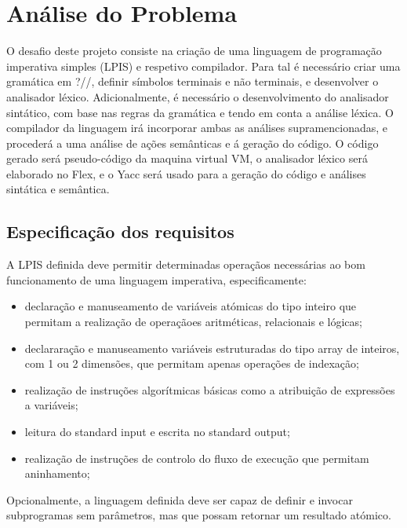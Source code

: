 \chapter{Análise do Problema}
\label{cap:analise}

O desafio deste projeto consiste na criação de uma linguagem de programação imperativa simples (LPIS) e respetivo compilador.
Para tal é necessário criar uma gramática em ?//, definir símbolos terminais e não terminais, e desenvolver o analisador léxico. Adicionalmente, é necessário o desenvolvimento do analisador sintático, com base nas regras da gramática e tendo em conta a análise léxica. O compilador da linguagem irá incorporar ambas as análises supramencionadas, e procederá a uma análise de ações semânticas e á geração do código. 
O código gerado será pseudo-código da maquina virtual VM, o analisador léxico será elaborado no Flex, e o Yacc será usado para a geração do código e análises sintática e semântica.   


\section{Especificação dos requisitos}
\label{sec:especificacao:analise}

A LPIS definida deve permitir determinadas operaçãos necessárias ao bom funcionamento de uma linguagem imperativa, especificamente:

\begin{itemize}
\item declaração e manuseamento de variáveis atómicas do tipo inteiro que permitam a realização de operaçãoes aritméticas, relacionais e lógicas;
\item declararação e manuseamento variáveis estruturadas do tipo array de inteiros, com 1 ou 2 dimensões, que permitam apenas operações de indexação;
\item realização de instruções algorítmicas básicas como a atribuição de expressões a variáveis;
\item leitura do standard input e escrita no standard output;
\item realização de instruções de controlo do fluxo de execução que permitam aninhamento;
\end{itemize}

Opcionalmente, a linguagem definida deve ser capaz de definir e invocar subprogramas sem parâmetros, mas que possam retornar um resultado atómico.

\newpage

